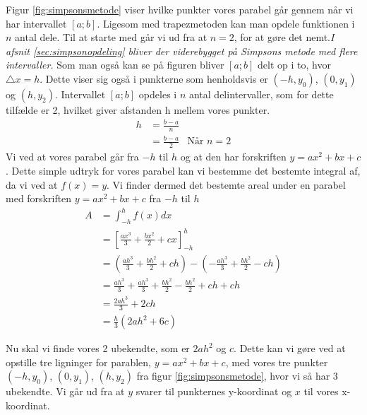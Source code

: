 \documentclass[12pt]{article}
\numberwithin{equation}{section}
\begin{document}
Figur \ref{fig:simpsonsmetode} viser hvilke punkter vores parabel går gennem når vi har intervallet $[a;b]$. Ligesom med trapezmetoden kan man opdele funktionen i $n$ antal dele. Til at starte med går vi ud fra at $n=2$, for at gøre det nemt.\emph{I afsnit \ref{sec:simpsonopdeling} bliver der viderebygget på Simpsons metode med flere intervaller.}
Som man også kan se på figuren bliver $[a;b]$ delt op i to, hvor $\triangle x=h$. Dette viser sig også i punkterne som henholdsvis er $(-h,y_0)$, $(0,y_1)$ og $(h,y_2)$. Intervallet $[a;b]$ opdeles i $n$ antal delintervaller, som for dette tilfælde er 2, hvilket giver afstanden h mellem vores punkter.
\begin{align}
h &= \frac{b-a}{n} \nonumber
\\&= \frac{b-a}{2} &\text{Når } n=2
\end{align}
Vi ved at vores parabel går fra $-h$ til $h$ og at den har forskriften $y=ax^2+bx+c$. Dette simple udtryk for vores parabel kan vi bestemme det bestemte integral af, da vi ved at $f(x)=y$. Vi finder dermed det bestemte areal under en parabel med forskriften $y=ax^2+bx+c$ fra $-h$ til $h$
\begin{align}
\label{eq:integral-hh}
A &=\int_{-h}^{h}f(x)dx \nonumber
\\ &=\left[ \frac{ax^3}{3} + \frac{bx^2}{2} + cx \right]_{-h}^{h} \nonumber
\\ &= \left( \frac{ah^3}{3} + \frac{bh^2}{2} + ch \right) - \left( -\frac{ah^3}{3} + \frac{bh^2}{2} - ch \right) \nonumber
\\ &= \frac{ah^3}{3} + \frac{ah^3}{3} + \frac{bh^2}{2} - \frac{bh^2}{2} + ch + ch \nonumber
\\ &= \frac{2ah^3}{3} + 2ch \nonumber
\\ &= \frac{h}{3}(2ah^2+6c)
\end{align}

Nu skal vi finde vores 2 ubekendte, som er $2ah^2$ og $c$. Dette kan vi gøre ved at opstille tre ligninger for parablen, $y=ax^2+bx+c$, med vores tre punkter $(-h,y_0)$, $(0,y_1)$, $(h,y_2)$ fra figur \ref{fig:simpsonsmetode}, hvor vi så har 3 ubekendte. Vi går ud fra at $y$ svarer til punkternes y-koordinat og $x$ til vores x-koordinat.
\end{document}

